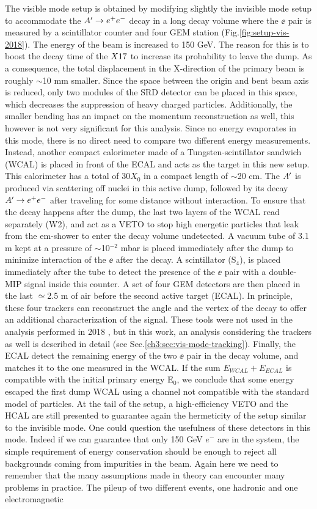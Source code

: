 The visible mode setup is obtained by modifying slightly the invisible mode setup to accommodate the $A' \to e^+e^-$ decay in a long decay volume where the $\ee$ pair is measured by a scintillator counter and four GEM station (Fig.\ref{fig:setup-vis-2018}). The energy of the beam is increased to 150 GeV. The reason for this is to boost the decay time of the $X17$ to increase its probability to leave the dump. As a consequence, the total displacement in the X-direction of the primary beam is roughly $\sim$10 \si{mm} smaller. Since the space between the origin and bent beam axis is reduced, only two modules of the SRD detector can be placed in this space, which decreases the suppression of heavy charged particles. Additionally, the smaller bending has an impact on the momentum reconstruction as well, this however is not very significant for this analysis. Since no energy evaporates in this mode, there is no direct need to compare two different energy measurements. Instead, another compact calorimeter made of a Tungsten-scintillator sandwich (WCAL) is placed in front of the ECAL and acts as the target in this new setup. This calorimeter has a total of 30$X_0$ in a compact length of $\sim$20 \si{cm}. The $A'$ is produced via scattering off nuclei in this active dump, followed by its decay $A' \to e^+e^-$ after traveling for some distance without interaction. To ensure that the decay happens after the dump, the last two layers of the WCAL read separately (W2), and act as a VETO to stop high energetic particles that leak from the em-shower to enter the decay volume undetected. A vacuum tube of 3.1 \si{m} kept at a pressure of $\sim$10$^{-2}$ \si{mbar} is placed immediately after the dump to minimize interaction of the $\ee$ after the decay. A scintillator (S$_4$), is placed immediately after the tube to detect the presence of the $\ee$ pair with a double-MIP signal inside this counter. A set of four GEM detectors are then placed in the last $\simeq$2.5 \si{m} of air before the second active target (ECAL). In principle, these four trackers can reconstruct the angle and the vertex of the decay to offer an additional characterization of the signal. These tools were not used in the analysis performed in 2018 \cite{Banerjee:2019hmi}, but in this work, an analysis considering the trackers as well is described in detail (see Sec.\ref{ch3:sec:vis-mode-tracking}). Finally, the ECAL detect the remaining energy of the two $\ee$ pair in the decay volume, and matches it to the one measured in the WCAL. If the sum $E_{WCAL}+E_{ECAL}$ is compatible with the initial primary energy E$_0$, we conclude that some energy escaped the first dump WCAL using a channel not compatible with the standard model of particles. At the tail of the setup, a high-efficiency VETO and the HCAL are still presented to guarantee again the hermeticity of the setup similar to the invisible mode. One could question the usefulness of these detectors in this mode. Indeed if we can guarantee that only 150 GeV $e^-$ are in the system, the simple requirement of energy conservation should be enough to reject all backgrounds coming from impurities in the beam. Again here we need to remember that the many assumptions made in theory can encounter many problems in practice. The pileup of two different events, one hadronic and one electromagnetic 